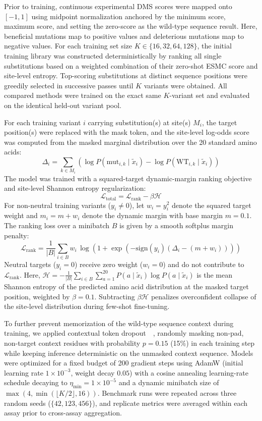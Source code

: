 \documentclass[sn-nature]{sn-jnl}
\begin{document}
    Prior to training, continuous experimental DMS scores were mapped onto $[-1, 1]$ using midpoint normalization anchored by the minimum score, maximum score, and setting the zero-score as the wild-type sequence result. Here, beneficial mutations map to positive values and deleterious mutations map to negative values. For each training set size $K \in \{16, 32, 64, 128\}$, the initial training library was constructed deterministically by ranking all single substitutions based on a weighted combination of their zero-shot ESMC score and site-level entropy. Top-scoring substitutions at distinct sequence positions were greedily selected in successive passes until $K$ variants were obtained. All compared methods were trained on the exact same $K$-variant set and evaluated on the identical held-out variant pool.

    For each training variant $i$ carrying substitution(s) at site(s) $M_i$, the target position(s) were replaced with the mask token, and the site-level log-odds score was computed from the masked marginal distribution over the 20 standard amino acids:
    \[
    \Delta_i = \sum_{k \in M_i} \left( \log P(\text{mut}_{i,k} \mid \tilde{x}_i) - \log P(\text{WT}_{i,k} \mid \tilde{x}_i) \right)
    \]
    The model was trained with a squared-target dynamic-margin ranking objective and site-level Shannon entropy regularization:
    \[
    \mathcal{L}_{\text{total}} = \mathcal{L}_{\text{rank}} - \beta \mathcal{H}
    \]
    For non-neutral training variants ($y_i \neq 0$), let $w_i = y_i^2$ denote the squared target weight and $m_i = m + w_i$ denote the dynamic margin with base margin $m = 0.1$. The ranking loss over a minibatch $B$ is given by a smooth softplus margin penalty:
    \[
    \mathcal{L}_{\text{rank}} = \frac{1}{|B|} \sum_{i \in B} w_i \, \log\!\left(1 + \exp\!\left(-\text{sign}(y_i)\left(\Delta_i - (m + w_i)\right)\right)\right)
    \]
    Neutral targets ($y_i = 0$) receive zero weight ($w_i = 0$) and do not contribute to $\mathcal{L}_{\text{rank}}$. Here, $\mathcal{H} = -\frac{1}{|B|}\sum_{i \in B}\sum_{a=1}^{20} P(a \mid \tilde{x}_i)\log P(a \mid \tilde{x}_i)$ is the mean Shannon entropy of the predicted amino acid distribution at the masked target position, weighted by $\beta = 0.1$. Subtracting $\beta \mathcal{H}$ penalizes overconfident collapse of the site-level distribution during few-shot fine-tuning.

    To further prevent memorization of the wild-type sequence context during training, we applied contextual token dropout~~\cite{srivastava2014dropout, zhang2020token, hua2025improving}, randomly masking non-pad, non-target context residues with probability $p = 0.15$ (15\%) in each training step while keeping inference deterministic on the unmasked context sequence. Models were optimized for a fixed budget of 200 gradient steps using AdamW (initial learning rate $1 \times 10^{-3}$, weight decay $0.05$) with a cosine annealing learning-rate schedule decaying to $\eta_{\min} = 1 \times 10^{-5}$ and a dynamic minibatch size of $\max(4, \min(\lfloor K/2 \rfloor, 16))$. Benchmark runs were repeated across three random seeds ($\{42, 123, 456\}$), and replicate metrics were averaged within each assay prior to cross-assay aggregation.
\end{document}
